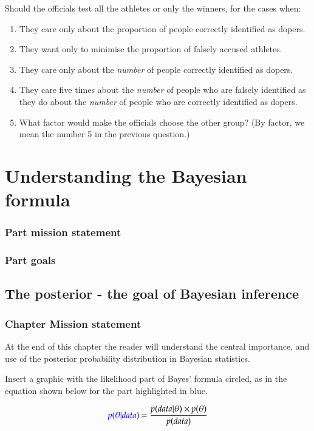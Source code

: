 \documentclass[11pt,fullpage]{book}
\begin{document}
Should the officials test all the athletes or only the winners, for the cases when:

\begin{enumerate}
\item They care only about the proportion of people correctly identified as dopers.
\item They want only to minimise the proportion of falsely accused athletes.
\item They care only about the \textit{number} of people correctly identified as dopers.
\item They care five times about the \textit{number} of people who are falsely identified as they do about the \textit{number} of people who are correctly identified as dopers.
\item What factor would make the officials choose the other group? (By factor, we mean the number 5 in the previous question.)
\end{enumerate}


\part{Understanding the Bayesian formula}\label{part:bayesianFormula}
\section{Part mission statement}
\section{Part goals}

\chapter{The posterior - the goal of Bayesian inference}\label{chap:posterior}
\section{Chapter Mission statement}
At the end of this chapter the reader will understand the central importance, and use of the posterior probability distribution in Bayesian statistics.

Insert a graphic with the likelihood part of Bayes' formula circled, as in the equation shown below for the part highlighted in blue.

\begin{equation}
{\color{blue}p(\theta|data)} = \frac{p(data|\theta)\times p(\theta)}{p(data)}
\end{equation}\label{eq:Posterior_BayesHighlighted}
\end{document}
